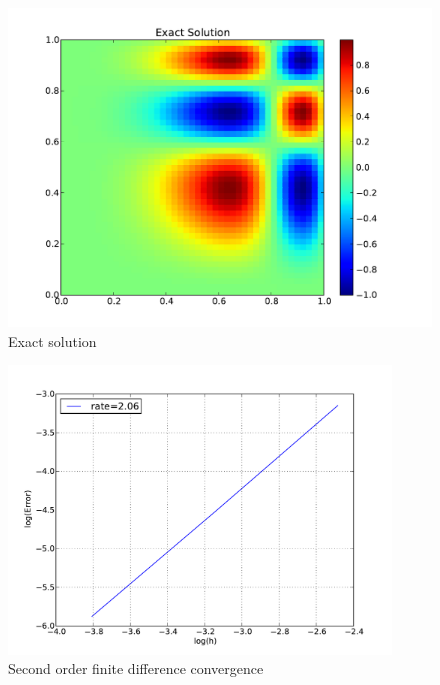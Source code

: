 \documentclass[10pt,letterpaper]{article}
\begin{document}
\begin{figure}[h]
\begin{center}
\includegraphics[width=5in,keepaspectratio]{Exact.pdf}
\end{center}
\caption{Exact solution}
\label{fig:Exact}
\end{figure}
\newpage 
\clearpage

\begin{figure}[h]
\begin{center}
\includegraphics[width=4in,keepaspectratio]{c.pdf}
\end{center}
\caption{Second order finite difference convergence}
\label{fig:c}
\end{figure}

\end{document}
